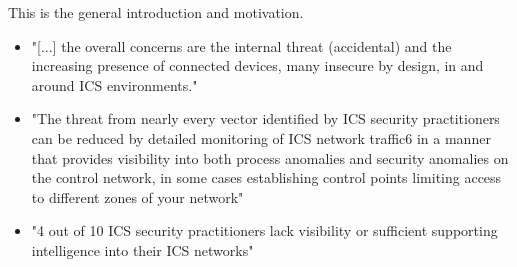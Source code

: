 This is the general introduction and motivation.
\begin{itemize}
	\item "[...] the overall concerns are the internal threat (accidental) and the increasing presence of connected devices, many insecure by design, in and around ICS environments." \parencite[p.~9]{Gregory-Brown2017}
	\item "The threat from nearly every vector identified by ICS security practitioners can be reduced by detailed monitoring of ICS network traffic6 in a manner that provides visibility into both process anomalies and security anomalies on the control network, in some cases establishing control points limiting access to different zones of your network" \parencite[p.~10]{Gregory-Brown2017}
	\item "4 out of 10 ICS security practitioners lack visibility or sufficient supporting intelligence into their ICS networks" \parencite[p.~13]{Gregory-Brown2017}
\end{itemize}